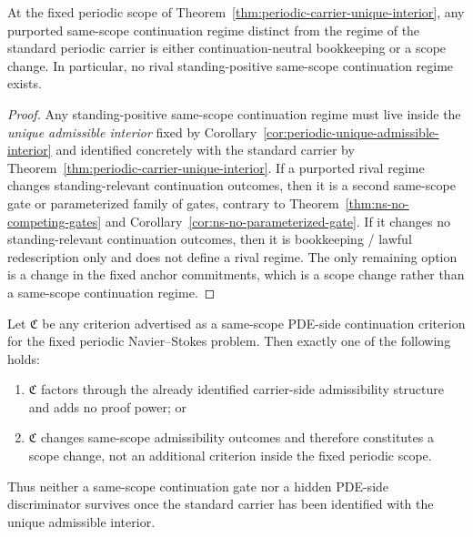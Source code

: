 \begin{manualcorollary}
\label{cor:no-alternative-same-scope-regime}
At the fixed periodic scope of Theorem~\ref{thm:periodic-carrier-unique-interior}, any purported
same-scope continuation regime distinct from the regime of the standard periodic carrier is either
continuation-neutral bookkeeping or a scope change. In particular, no rival standing-positive
same-scope continuation regime exists.
\end{manualcorollary}

\begin{proof}
Any standing-positive same-scope continuation regime must live inside the \emph{unique admissible
interior} fixed by Corollary~\ref{cor:periodic-unique-admissible-interior} and identified concretely with the
standard carrier by Theorem~\ref{thm:periodic-carrier-unique-interior}. If a purported rival regime
changes standing-relevant continuation outcomes, then it is a second same-scope gate or parameterized
family of gates, contrary to Theorem~\ref{thm:ns-no-competing-gates} and
Corollary~\ref{cor:ns-no-parameterized-gate}. If it changes no standing-relevant continuation
outcomes, then it is bookkeeping / lawful redescription only and does not define a rival regime. The
only remaining option is a change in the fixed anchor commitments, which is a scope change rather
than a same-scope continuation regime.
\end{proof}

\begin{manualproposition}
\label{prop:no-additional-pde-side-criterion}
Let $\mathfrak C$ be any criterion advertised as a same-scope PDE-side continuation criterion for the
fixed periodic Navier--Stokes problem. Then exactly one of the following holds:
\begin{enumerate}[label=(\roman*), leftmargin=2.2em]
\item $\mathfrak C$ factors through the already identified carrier-side admissibility structure and adds
no proof power; or
\item $\mathfrak C$ changes same-scope admissibility outcomes and therefore constitutes a scope change,
not an additional criterion inside the fixed periodic scope.
\end{enumerate}
Thus neither a same-scope continuation gate nor a hidden PDE-side discriminator survives once the
standard carrier has been identified with the unique admissible interior.
\end{manualproposition}

